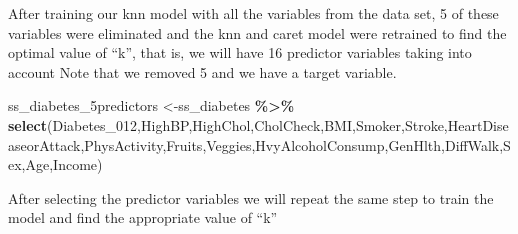 \documentclass[
]{article}
\newenvironment{Shaded}{\begin{snugshade}}{\end{snugshade}}
\newcommand{\AttributeTok}[1]{\textcolor[rgb]{0.13,0.29,0.53}{#1}}
\newcommand{\DecValTok}[1]{\textcolor[rgb]{0.00,0.00,0.81}{#1}}
\newcommand{\FunctionTok}[1]{\textcolor[rgb]{0.13,0.29,0.53}{\textbf{#1}}}
\newcommand{\NormalTok}[1]{#1}
\newcommand{\OtherTok}[1]{\textcolor[rgb]{0.56,0.35,0.01}{#1}}
\newcommand{\SpecialCharTok}[1]{\textcolor[rgb]{0.81,0.36,0.00}{\textbf{#1}}}
\begin{document}
After training our knn model with all the variables from the data set, 5
of these variables were eliminated and the knn and caret model were
retrained to find the optimal value of ``k'', that is, we will have 16
predictor variables taking into account Note that we removed 5 and we
have a target variable.

\begin{Shaded}
\begin{Highlighting}[]
\NormalTok{ss\_diabetes\_5predictors }\OtherTok{\textless{}{-}}\NormalTok{ss\_diabetes }\SpecialCharTok{\%\textgreater{}\%}
  \FunctionTok{select}\NormalTok{(Diabetes\_012,HighBP,HighChol,CholCheck,BMI,Smoker,Stroke,HeartDiseaseorAttack,PhysActivity,Fruits,Veggies,HvyAlcoholConsump,GenHlth,DiffWalk,Sex,Age,Income)}
\end{Highlighting}
\end{Shaded}

After selecting the predictor variables we will repeat the same step to
train the model and find the appropriate value of ``k''

\begin{Shaded}
\end{Shaded}
\end{document}
